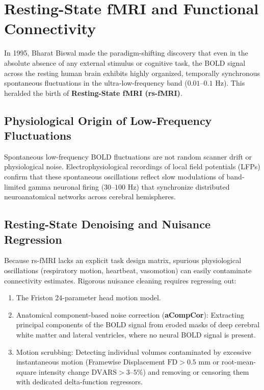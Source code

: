 \documentclass[11pt,a4paper]{article}
\begin{document}
\section{Resting-State fMRI and Functional Connectivity}
In 1995, Bharat Biswal made the paradigm-shifting discovery that even in the absolute absence of any external stimulus or cognitive task, the BOLD signal across the resting human brain exhibits highly organized, temporally synchronous spontaneous fluctuations in the ultra-low-frequency band ($0.01\text{--}0.1\text{ Hz}$). This heralded the birth of \textbf{Resting-State fMRI (rs-fMRI)}.

\subsection{Physiological Origin of Low-Frequency Fluctuations}
Spontaneous low-frequency BOLD fluctuations are not random scanner drift or physiological noise. Electrophysiological recordings of local field potentials (LFPs) confirm that these spontaneous oscillations reflect slow modulations of band-limited gamma neuronal firing ($30\text{--}100\text{ Hz}$) that synchronize distributed neuroanatomical networks across cerebral hemispheres.

\subsection{Resting-State Denoising and Nuisance Regression}
Because rs-fMRI lacks an explicit task design matrix, spurious physiological oscillations (respiratory motion, heartbeat, vasomotion) can easily contaminate connectivity estimates. Rigorous nuisance cleaning requires regressing out:
\begin{enumerate}
    \item The Friston 24-parameter head motion model.
    \item Anatomical component-based noise correction (\textbf{aCompCor}): Extracting principal components of the BOLD signal from eroded masks of deep cerebral white matter and lateral ventricles, where no neural BOLD signal is present.
    \item Motion scrubbing: Detecting individual volumes contaminated by excessive instantaneous motion (Framewise Displacement $\text{FD} > 0.5\text{ mm}$ or root-mean-square intensity change $\text{DVARS} > 3\text{--}5\%$) and removing or censoring them with dedicated delta-function regressors.
\end{enumerate}
\end{document}
